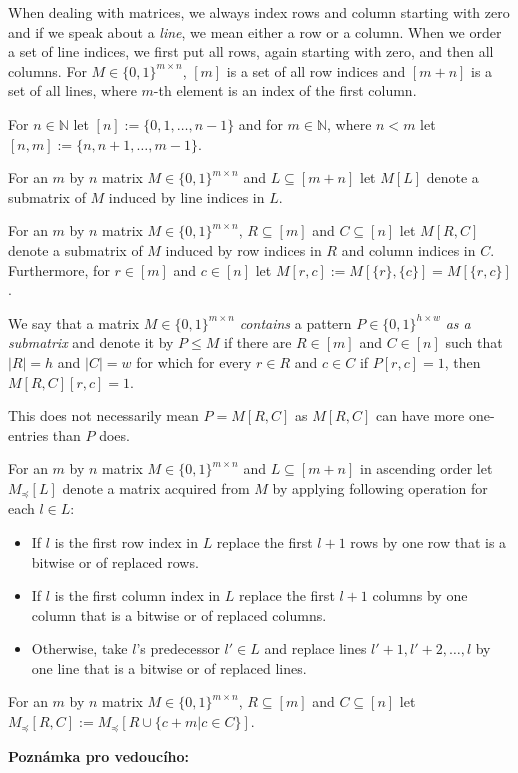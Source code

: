 \documentclass[12pt,a4paper]{report}
\begin{document}
When dealing with matrices, we always index rows and column starting with zero and if we speak about a \emph{line}, we mean either a row or a column. When we order a set of line indices, we first put all rows, again starting with zero, and then all columns. For $M\in\{0,1\}^{m\times n}$, $[m]$ is a set of all row indices and $[m+n]$ is a set of all lines, where $m$-th element is an index of the first column.
\begin{ntn}
For $n\in\mathbb{N}$ let $[n]:=\{0,1,\dots,n-1\}$ and for $m\in\mathbb{N}$, where $n<m$ let $[n,m]:=\{n,n+1,\dots,m-1\}$.
\end{ntn}
\begin{ntn}
For an $m$ by $n$ matrix $M\in\{0,1\}^{m\times n}$ and $L\subseteq[m+n]$ let $M[L]$ denote a submatrix of $M$ induced by line indices in $L$.
\end{ntn}
\begin{ntn}
For an $m$ by $n$ matrix $M\in\{0,1\}^{m\times n}$, $R\subseteq[m]$ and $C\subseteq[n]$ let $M[R,C]$ denote a submatrix of $M$ induced by row indices in $R$ and column indices in $C$. Furthermore, for $r\in[m]$ and $c\in[n]$ let $M[r,c]:=M[\{r\},\{c\}]=M[\{r,c\}]$.
\end{ntn}
\begin{defn}
We say that a matrix $M\in\{0,1\}^{m\times n}$ \emph{contains} a pattern $P\in\{0,1\}^{h\times w}$ \emph{as a submatrix} and denote it by $P\leq M$ if there are $R\in[m]$ and $C\in[n]$ such that $|R|=h$ and $|C|=w$ for which for every $r\in R$ and $c\in C$ if $P[r,c]=1$, then $M[R,C][r,c]=1$.
\end{defn}
This does not necessarily mean $P=M[R,C]$ as $M[R,C]$ can have more one-entries than $P$ does.
\begin{ntn}
For an $m$ by $n$ matrix $M\in\{0,1\}^{m\times n}$ and $L\subseteq[m+n]$ in ascending order let $M_{\preceq}[L]$ denote a matrix acquired from $M$ by applying following operation for each $l\in L$:
\begin{itemize}
\item If $l$ is the first row index in $L$ replace the first $l+1$ rows by one row that is a bitwise or of replaced rows.
\item If $l$ is the first column index in $L$ replace the first $l+1$ columns by one column that is a bitwise or of replaced columns.
\item Otherwise, take $l$'s predecessor $l'\in L$ and replace lines $l'+1,l'+2,\dots,l$ by one line that is a bitwise or of replaced lines.
\end{itemize}
\end{ntn}
\begin{ntn}
For an $m$ by $n$ matrix $M\in\{0,1\}^{m\times n}$, $R\subseteq[m]$ and $C\subseteq[n]$ let $M_{\preceq}[R,C]:=M_{\preceq}[R\cup \{c+m|c\in C\}]$.
\end{ntn}
\textbf{Poznámka pro vedoucího:}
\end{document}
